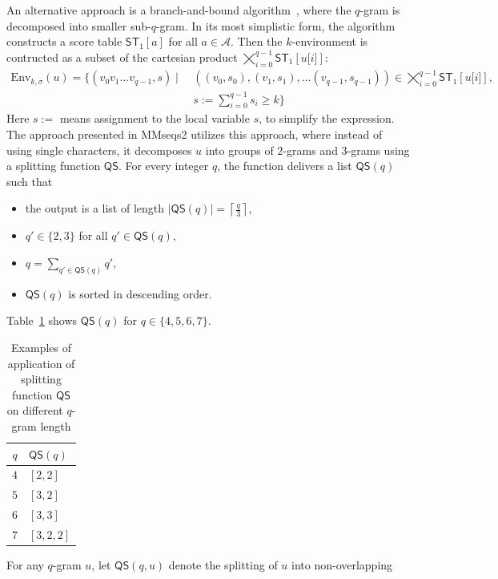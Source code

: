 \documentclass[twoside,a4paper,bsc]{master}
\newcommand{\Qgram}[1]{\(#1\)-gram}
\newcommand{\Subchar}[2]{#1\lbrack #2\rbrack}
\newcommand{\Scoretablename}[0]{\mathsf{ST}}
\newcommand{\Scoretable}[2]{\Scoretablename_{#1}[#2]}
\newcommand{\Alpha}[0]{\mathcal{A}}
\newcommand{\Qsplit}{\mathsf{QS}}
\begin{document}
An alternative
approach
is a branch-and-bound algorithm~\cite{land2010automatic}, where the
\Qgram{q} is
decomposed into smaller sub-\Qgram{q}. In its most simplistic form, the
algorithm constructs a score table \(\Scoretable{1}{a}\) for all
\(a\in\Alpha\).
Then the \(k\)-environment is contructed as a subset of the cartesian product
\(\bigtimes_{i=0}^{q-1} \Scoretable{1}{\Subchar{u}{i}}\):
\begin{align}
\text{Env}_{k,\sigma}(u) = \{(v_{0}v_{1}\ldots v_{q-1},s) \mid
& ~((v_{0},s_{0}),(v_{1},s_{1}),\ldots
(v_{q-1},s_{q-1}))\in\bigtimes\nolimits_{i=0}^{q-1}\Scoretable{1}{\Subchar{u}{i}},\nonumber\\
& ~s:=\sum\nolimits_{i=0}^{q-1}s_{i}\geq k\}
\label{eq:singleCharCartesian}
\end{align}
Here \(s:=\) means assignment to the local variable \(s\), to simplify the
expression.
The approach presented in MMseqs2 utilizes this approach, where instead
of using single characters, it decomposes \(u\) into groups of \Qgram{2}s and
\Qgram{3}s using a splitting function \(\Qsplit\). For every
integer \(q\), the function delivers a list \(\Qsplit(q)\) such that
\begin{itemize}
\item the output is a list of length
\(|\Qsplit(q)| =
\left\lceil\frac{q}{3}\right\rceil\),
\item \(q'\in\{2,3\}\) for all \(q'\in\Qsplit(q)\),
\item \(q = \sum_{q'\in\Qsplit(q)}q'\),
\item \(\Qsplit(q)\) is sorted in descending order.
\end{itemize}
Table~\ref{tab:splitting} shows \(\Qsplit(q)\) for
\(q\in\{4,5,6,7\}\).
\begin{table}
\begin{center}
\begin{tabular}{c|l}
\(q\) & \(\Qsplit(q)\)\\
\hline
\(4\) & \([2,2]\)\\
\(5\) & \([3,2]\)\\
\(6\) & \([3,3]\)\\
\(7\) & \([3,2,2]\)\\
\end{tabular}
\caption{Examples of application of splitting function \(\Qsplit\) on
different
\Qgram{q} length}\label{tab:splitting}
\end{center}
\end{table}
For any \(q\)-gram \(u\),
let \(\Qsplit(q,u)\) denote the splitting of \(u\) into non-overlapping
\end{document}
